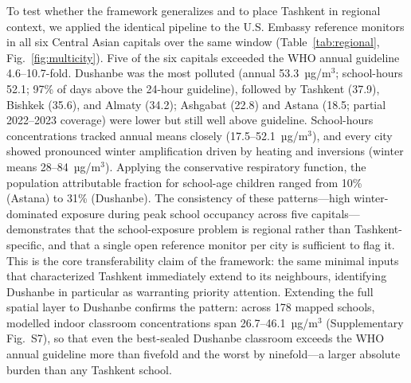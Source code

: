 \documentclass[11pt,a4paper]{article}
\begin{document}
To test whether the framework generalizes and to place Tashkent in regional context, we applied the identical pipeline to the U.S. Embassy reference monitors in all six Central Asian capitals over the same window (Table~\ref{tab:regional}, Fig.~\ref{fig:multicity}). Five of the six capitals exceeded the WHO annual guideline 4.6--10.7-fold. Dushanbe was the most polluted (annual 53.3~µg/m$^3$; school-hours 52.1; 97\% of days above the 24-hour guideline), followed by Tashkent (37.9), Bishkek (35.6), and Almaty (34.2); Ashgabat (22.8) and Astana (18.5; partial 2022--2023 coverage) were lower but still well above guideline. School-hours concentrations tracked annual means closely (17.5--52.1~µg/m$^3$), and every city showed pronounced winter amplification driven by heating and inversions (winter means 28--84~µg/m$^3$). Applying the conservative respiratory function, the population attributable fraction for school-age children ranged from 10\% (Astana) to 31\% (Dushanbe). The consistency of these patterns---high winter-dominated exposure during peak school occupancy across five capitals---demonstrates that the school-exposure problem is regional rather than Tashkent-specific, and that a single open reference monitor per city is sufficient to flag it. This is the core transferability claim of the framework: the same minimal inputs that characterized Tashkent immediately extend to its neighbours, identifying Dushanbe in particular as warranting priority attention. Extending the full spatial layer to Dushanbe confirms the pattern: across 178 mapped schools, modelled indoor classroom concentrations span 26.7--46.1~µg/m$^3$ (Supplementary Fig.~S7), so that even the best-sealed Dushanbe classroom exceeds the WHO annual guideline more than fivefold and the worst by ninefold---a larger absolute burden than any Tashkent school.
\end{document}
